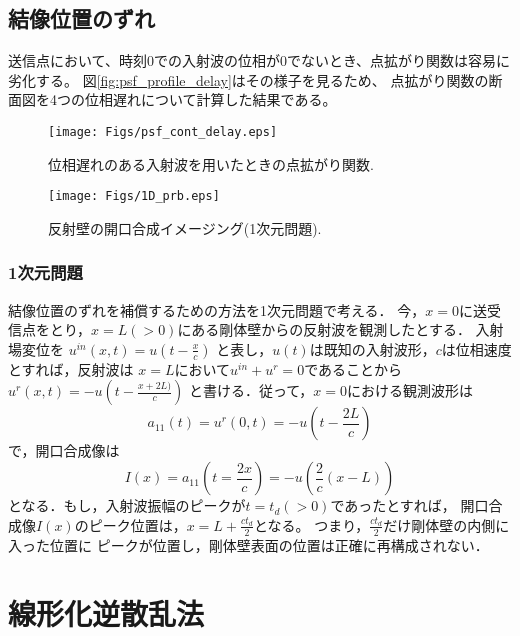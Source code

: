 \documentclass[10pt,a4j,dvipdfmx]{jarticle}
\begin{document}
\subsection{結像位置のずれ}
送信点において、時刻0での入射波の位相が0でないとき、点拡がり関数は容易に劣化する。
図\ref{fig:psf_profile_delay}はその様子を見るため、
点拡がり関数の断面図を4つの位相遅れについて計算した結果である。
\begin{figure}[h]
	\begin{center}
	\texttt{[image: Figs/psf\_cont\_delay.eps]} 
	\end{center}
	\caption{位相遅れのある入射波を用いたときの点拡がり関数.} 
	\label{fig:psf_cont_delay}
\end{figure}
\begin{figure}[h]
	\begin{center}
	\texttt{[image: Figs/1D\_prb.eps]} 
	\end{center}
	\caption{反射壁の開口合成イメージング(1次元問題).} 
	\label{fig:1D_prb}
\end{figure}
\subsubsection{1次元問題}
結像位置のずれを補償するための方法を1次元問題で考える．
今，$x=0$に送受信点をとり，$x=L(>0)$にある剛体壁からの反射波を観測したとする．
入射場変位を
$u^{in}(x,t)=u\left(t-\frac{x}{c}\right)$
と表し，$u(t)$は既知の入射波形，$c$は位相速度とすれば，反射波は
$x=L$において$u^{in}+u^{r}=0$であることから
$u^{r}(x,t)=-u\left(t-\frac{x+2L)}{c}\right)$
と書ける．従って，$x=0$における観測波形は
\begin{equation}
	a_{11}(t)=u^{r}(0,t)=-u\left( t-\frac{2L}{c}\right)
	\label{eqn:}
\end{equation}
で，開口合成像は
\begin{equation}
	I(x)=
	a_{11}\left(t=\frac{2x}{c}\right)
	=
	-u\left(\frac{2}{c}(x-L)\right)
	\label{eqn:}
\end{equation}
となる．もし，入射波振幅のピークが$t=t_d(>0)$であったとすれば，
開口合成像$I(x)$のピーク位置は，$x=L+\frac{ct_d}{2}$となる。
つまり，$\frac{ct_d}{2}$だけ剛体壁の内側に入った位置に
ピークが位置し，剛体壁表面の位置は正確に再構成されない．
\section{線形化逆散乱法}
\end{document}

